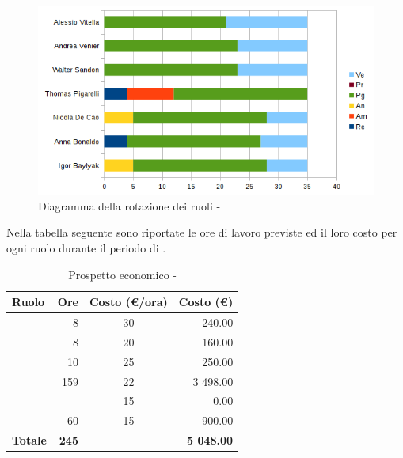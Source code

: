 \documentclass[12pt,a4paper]{article}
\begin{document}
\begin{center}
	\begin{figure}[H]
		\centering	\includegraphics[width=\textwidth]{../img/diagrammaBarreProgettazioneArchitetturaleRotazioneRuoli.png}
		\caption{Diagramma della rotazione dei ruoli - \FPA{}}
	\end{figure}
\end{center}

\newpage
{}
Nella tabella seguente sono riportate le ore di lavoro previste ed il loro costo per ogni ruolo durante il periodo di \FP.

\begin{table}[H]
	\begin{center}
		\begin{tabular}{l r c r}
			\toprule
			\textbf{Ruolo}	& \textbf{Ore} & \textbf{Costo (\euro/ora)}	& \textbf{Costo (\euro)} \\ \midrule
			\midrule
			\RE{} & 8 & 30 & 240.00 \\ \midrule
			\AM{} & 8 & 20 & 160.00 \\ \midrule
			\AN{} & 10 & 25 & 250.00 \\ \midrule
			\PG{} & 159 & 22 & 3 498.00 \\ \midrule
			\PR{} & & 15 & 0.00 \\ \midrule
			\VR{} & 60 & 15 & 900.00 \\ \midrule
			\textbf{Totale} & \textbf{245} &  & \textbf{5 048.00} \\
			\bottomrule
		\end{tabular}
		\caption{Prospetto economico - \FPA{}}
	\end{center}
\end{table}
\end{document}
